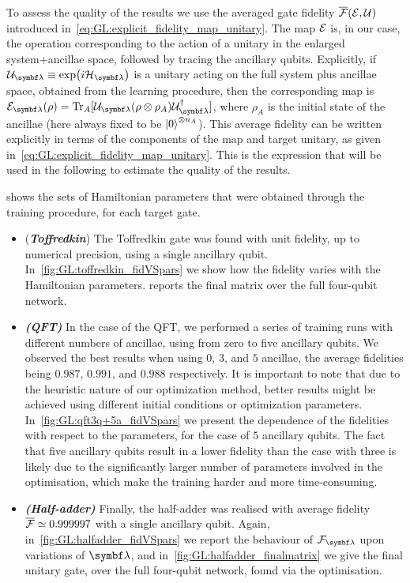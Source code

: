 To assess the quality of the results we use the averaged gate fidelity $\overline{{\mathcal{F}}}({\mathcal{E}},{\mathcal{U}})$ introduced in~\cref{eq:GL:explicit_fidelity_map_unitary}.
The map ${\mathcal{E}}$ is, in our case, the operation corresponding to the action of a unitary in the enlarged system+ancillae space, followed by tracing the ancillary qubits.
Explicitly, if $\calU_\bslambda\equiv\exp(i\calH_\bslambda)$ is a unitary acting on the full system plus ancillae space, obtained from the learning procedure, then the corresponding map is
$\calE_\bslambda(\rho) = \Tr_A[\calU_\bslambda(\rho\otimes\rho_A) \calU_\bslambda^\dagger]$,
where $\rho_A$ is the initial state of the ancillae (here always fixed to be $\ket0^{\otimes n_A}$).
This average fidelity can be written explicitly in terms of the components of the map and target unitary, as given in~\cref{eq:GL:explicit_fidelity_map_unitary}. This is the expression that will be used in the following to estimate the quality of the results.

 shows the sets of Hamiltonian parameters that were obtained through the training procedure, for each target gate.
\begin{itemize}
    \item (\textbf{\emph{Toffredkin}}) The Toffredkin gate was found with unit fidelity, up to numerical precision, using a single ancillary qubit. In~\cref{fig:GL:toffredkin_fidVSpars} we show how the fidelity varies with the Hamiltonian parameters.  reports the final matrix over the full four-qubit network.
    \item \textbf{\emph{(QFT)}} In the case of the \ac{QFT}, we performed a series of training runs with different numbers of ancillae, using from zero to five ancillary qubits.
    We observed the best results when using $0$, $3$, and $5$ ancillae, the average fidelities being $0.987$, $0.991$, and $0.988$ respectively.
    It is important to note that due to the heuristic nature of our optimization method, better results might be achieved using different initial conditions or optimization parameters.
    In~\cref{fig:GL:qft3q+5a_fidVSpars} we present the dependence of the fidelities with respect to the parameters, for the case of $5$ ancillary qubits.
    The fact that five ancillary qubits result in a lower fidelity than the case with three is likely due to the significantly larger number of parameters involved in the optimisation, which make the training harder and more time-consuming.
    \item \textbf{\emph{(Half-adder)}} Finally, the half-adder was realised with average fidelity $\overline{{\mathcal{F}}}\simeq0.999997$ with a single ancillary qubit.
    Again, in~\cref{fig:GL:halfadder_fidVSpars} we report the behaviour of $\calF_\bslambda$ upon variations of $\bslambda$, and in~\cref{fig:GL:halfadder_finalmatrix} we give the final unitary gate, over the full four-qubit network, found via the optimisation.
\end{itemize}

